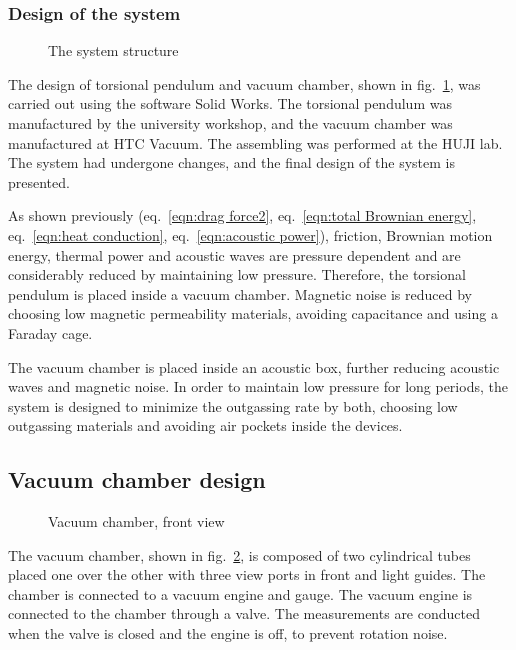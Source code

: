 \documentclass[\main/master.tex]{subfiles}
\begin{document}
\subsubsection{Design of the system}
\begin{figure}[htbp]
	\centering
	\caption[Total chamber]{The system structure}
	\label{fig:Total chamber}
\end{figure}
\FloatBarrier
\par\noindent
The design of torsional pendulum and vacuum chamber, shown in fig.~\ref{fig:Total chamber}, was carried out using the software Solid Works. The torsional pendulum was manufactured by the university workshop, and the vacuum chamber was manufactured at HTC Vacuum. The assembling was performed at the HUJI lab. The system had undergone changes, and the final design of the system is presented. 
\par\noindent
As shown previously (eq.~\ref{eqn:drag force2}, eq.~\ref{eqn:total Brownian energy}, eq.~\ref{eqn:heat conduction}, eq.~\ref{eqn:acoustic power}), friction, Brownian motion energy, thermal power and acoustic waves are pressure dependent and are considerably reduced by maintaining low pressure. Therefore, the torsional pendulum is placed inside a vacuum chamber. Magnetic noise is reduced by choosing low magnetic permeability materials, avoiding capacitance and using a Faraday cage. 
\par\noindent
The vacuum chamber is placed inside an acoustic box, further reducing acoustic waves and magnetic noise. In order to maintain low pressure for long periods, the system is designed to minimize the outgassing rate by both, choosing low outgassing materials and avoiding air pockets inside the devices. 
\subsection{Vacuum chamber design}
\begin{figure}[htbp]
	\centering
	\caption[Vacuum chamber, front view]{Vacuum chamber, front view}
	\label{fig:chamber front}
\end{figure}
\FloatBarrier

\par\noindent
The vacuum chamber, shown in fig.~\ref{fig:chamber front}, is composed of two cylindrical tubes placed one over the other with three view ports in front and light guides. The chamber is connected to a vacuum engine and gauge. The vacuum engine is connected to the chamber through a valve. The measurements are conducted when the valve is closed and the engine is off, to prevent rotation noise.
\end{document}

